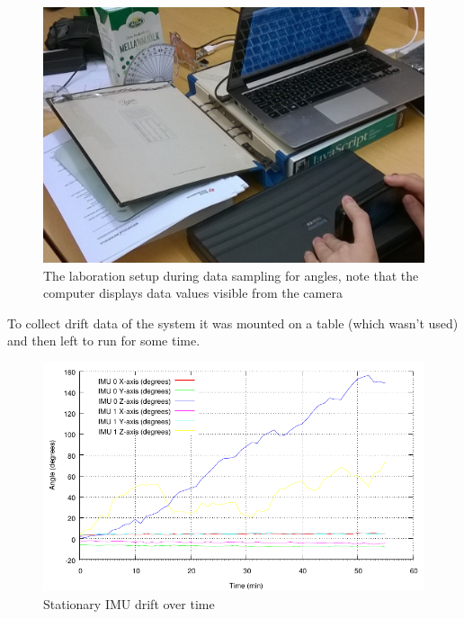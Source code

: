 \documentclass[a4paper, 12pt]{article}
\begin{document}
\begin{figure}[h!]
    \centering
    \includegraphics[scale=0.27]{croped.jpg}
    \caption{The laboration setup during data sampling for angles, note that the computer displays data values visible from the camera}
    \label{fig:pic7}
\end{figure}

To collect drift data of the system it was mounted on a table (which wasn't used) and then left to run for some time.  

\begin{figure}[h!]
    \centering
    \includegraphics[scale=1.15]{drift.pdf}
    \caption{Stationary IMU drift over time}
    \label{fig:pic8}
\end{figure}
\end{document}
